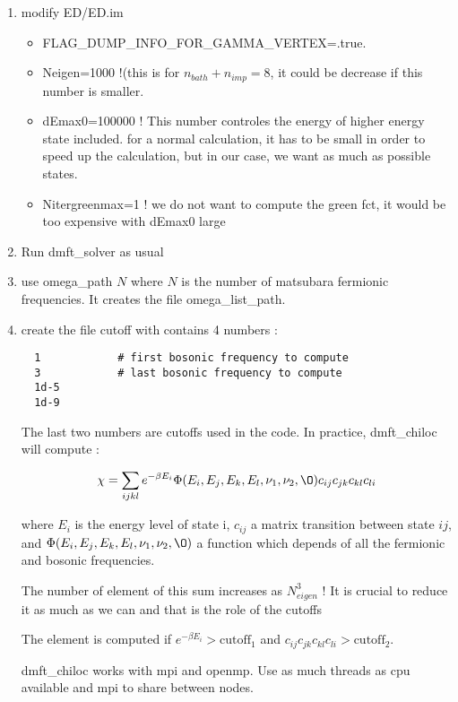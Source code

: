 \documentclass{book}
\def\b{\beta}
\def\v{\nu}
\begin{document}
\begin{enumerate}
\item modify ED/ED.im
  \begin{itemize}
  \item FLAG\_DUMP\_INFO\_FOR\_GAMMA\_VERTEX=.true.
  \item Neigen=1000 !(this is for $n_{bath}+n_{imp} = 8$, it could be decrease if this number is smaller.
  \item dEmax0=100000 !  This number controles the energy of higher energy state included. for a normal calculation, it has to be small in order to speed up the calculation, but in our case, we want as much as possible states.
  \item  Nitergreenmax=1 ! we do not want to compute the green fct, it would be too expensive with  dEmax0 large
  \end{itemize}

\item Run dmft\_solver as usual

\item use omega\_path $N$ where $N$ is the number of matsubara fermionic frequencies. It creates the file omega\_list\_path.

\item create the file cutoff with contains 4 numbers :

\begin{lstlisting}
  1            # first bosonic frequency to compute
  3            # last bosonic frequency to compute
  1d-5
  1d-9
\end{lstlisting}
The last two numbers are cutoffs used in the code.
In practice, dmft\_chiloc will  compute  :

\begin{equation}
  \chi = \sum_{ijkl} e^{-\b E_i} \Phi(E_i,E_j,E_k,E_l,\v_1,\v_2,\O) c_{ij}c_{jk}c_{kl}c_{li}
\end{equation}

where $E_i$ is the energy level of state i,  $c_{ij}$ a matrix transition between state $ij$, and  $ \Phi(E_i,E_j,E_k,E_l,\v_1,\v_2,\O)$ a function which depends of all the fermionic and bosonic frequencies.

The number of element of this sum increases as $N_{eigen}^3$ ! It is crucial to reduce it as much as we can and that is the role of the cutoffs

The element is computed if $e^{-\b E_i} >\text{cutoff}_1$ and $c_{ij}c_{jk}c_{kl}c_{li} >\text{cutoff}_2$.


dmft\_chiloc works with mpi and openmp. Use as much threads as cpu available  and mpi to share between nodes.



\end{enumerate}
\end{document}
